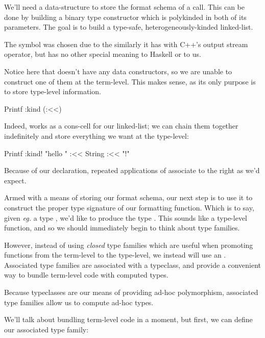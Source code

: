 \documentclass[book.tex]{subfiles}
\begin{document}

We'll need a data-structure to store the format schema of a  call.
This can be done by building a binary type constructor which is polykinded in
both of its parameters. The goal is to build a type-safe, heterogeneously-kinded
linked-list.


The \ty{(:<<)} symbol was chosen due to the similarly it has with C++'s \cpp{<<}
output stream operator, but has no other special meaning to Haskell or to us.

Notice here that \ty{(:<<)} doesn't have any data constructors, so we are unable
to construct one of them at the term-level. This makes sense, as its only
purpose is to store type-level information.

\begin{dorepl}{Printf}
:kind (:<<)
\end{dorepl}

Indeed, \ty{(:<<)} works as a cons-cell for our linked-list; we can chain them
together indefinitely and store everything we want at the type-level:

\begin{dorepl}{Printf}
:kind! "hello " :<< String :<< "!"
\end{dorepl}

Because of our  declaration, repeated applications of
\ty{(:<<)} associate to the right as we'd expect.

Armed with a means of storing our format schema, our next step is to use it to
construct the proper type signature of our formatting function. Which is to say,
given \emph{eg.} a type , we'd like to produce
the type . This sounds like a type-level function,
and so we should immediately begin to think about type families.

However, instead of using \emph{closed} type families which are useful when
promoting functions from the term-level to the type-level, we instead will use
an . Associated type families are associated with a
typeclass, and provide a convenient way to bundle term-level code with computed
types.

Because typeclasses are our means of providing ad-hoc polymorphism, associated
type families allow us to compute ad-hoc types.

We'll talk about bundling term-level code in a moment, but first, we can
define our associated type family:
\end{document}
